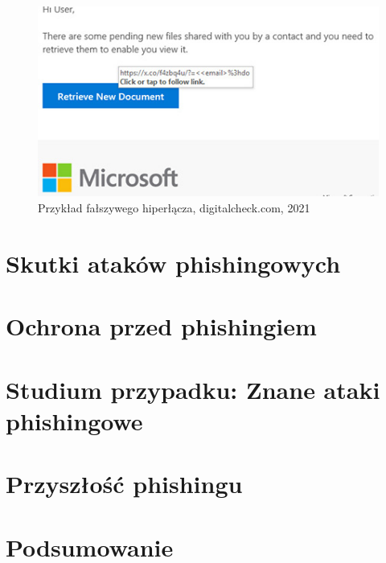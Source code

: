 \documentclass[]{article}
\begin{document}
\begin{figure}[h!]
	\centering
	\includegraphics[width=0.6\linewidth]{Pictures/url_phishing.jpg}
	\caption{Przykład fałszywego hiperłącza, digitalcheck.com, 2021}
	\label{fig:url_phishing}
\end{figure}

\newpage
\section{Skutki ataków phishingowych}

\newpage
\section{Ochrona przed phishingiem}

\newpage
\section{Studium przypadku: Znane ataki phishingowe}

\newpage
\section{Przyszłość phishingu}

\newpage
\section{Podsumowanie}

\newpage


\end{document}
